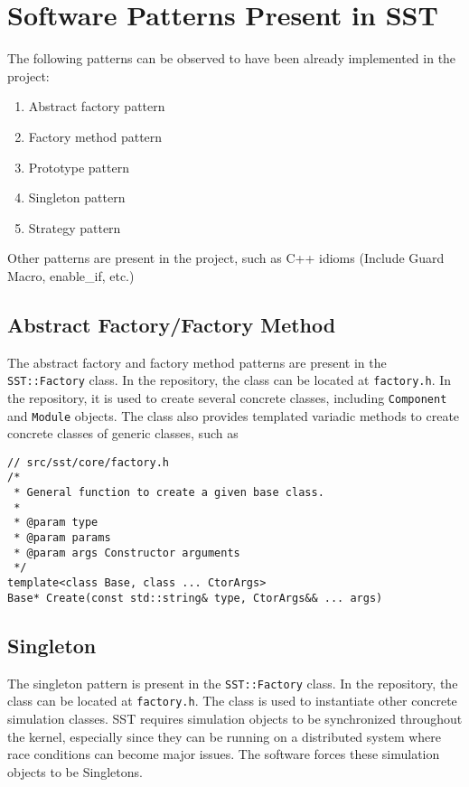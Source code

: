 \section{Software Patterns Present in SST}
The following patterns can be observed to have been already implemented in the project:
\begin{enumerate}
    \item Abstract factory pattern
    \item Factory method pattern
    \item Prototype pattern
    \item Singleton pattern
    \item Strategy pattern
\end{enumerate}
Other patterns are present in the project, such as C++ idioms (Include Guard Macro, enable\_if, etc.)

\subsection{Abstract Factory/Factory Method}
The abstract factory and factory method patterns are present in the \texttt{SST::Factory} class. In the repository, the class can be located at \texttt{factory.h}. In the repository, it is used to create several concrete classes, including \texttt{Component} and \texttt{Module} objects. The class also provides templated variadic methods to create concrete classes of generic classes, such as
\begin{lstlisting}[style=customC++]
// src/sst/core/factory.h
/*
 * General function to create a given base class.
 *
 * @param type
 * @param params
 * @param args Constructor arguments
 */
template<class Base, class ... CtorArgs>
Base* Create(const std::string& type, CtorArgs&& ... args)
\end{lstlisting}

\subsection{Singleton}
The singleton pattern is present in the \texttt{SST::Factory} class. In the repository, the class can be located at \texttt{factory.h}. The class is used to instantiate other concrete simulation classes. SST requires simulation objects to be synchronized throughout the kernel, especially since they can be running on a distributed system where race conditions can become major issues. The software forces these simulation objects to be Singletons.


